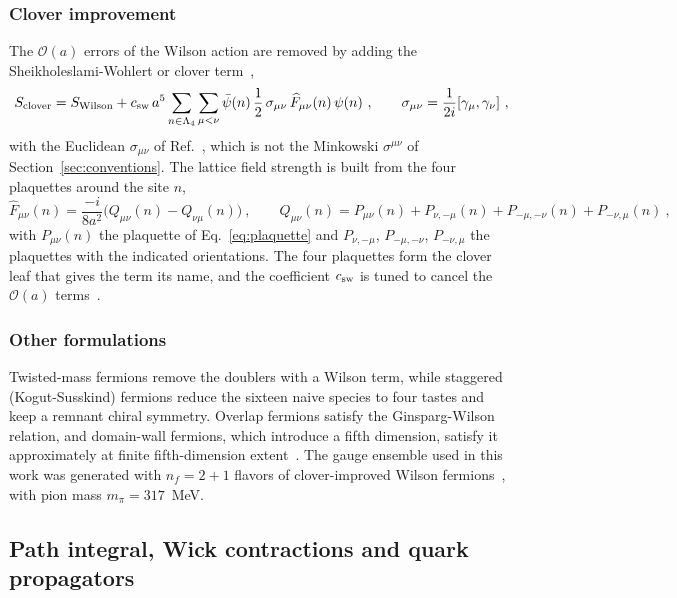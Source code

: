 \subsubsection{Clover improvement}
The $\mathcal O(a)$ errors of the Wilson action are removed by adding the Sheikholeslami-Wohlert or clover term~\cite{Sheikholeslami:1985ij,Gattringer:2010zz},
\begin{equation}
    S_{\rm clover}=S_{\rm Wilson}+c_{\rm sw}\,a^5\sum_{n\in\Lambda_4}\sum_{\mu<\nu}\bar\psi(n)\,\frac12\,\sigma_{\mu\nu}\,\widehat F_{\mu\nu}(n)\,\psi(n) \ , \qquad \sigma_{\mu\nu}=\frac{1}{2i}[\gamma_\mu,\gamma_\nu] \ ,
    \label{eq:clover_action}
\end{equation}
with the Euclidean $\sigma_{\mu\nu}$ of Ref.~\cite{Gattringer:2010zz}, which is not the Minkowski $\sigma^{\mu\nu}$ of Section~\ref{sec:conventions}. The lattice field strength is built from the four plaquettes around the site $n$,
\begin{equation}
    \widehat F_{\mu\nu}(n)=\frac{-i}{8a^2}\big(Q_{\mu\nu}(n)-Q_{\nu\mu}(n)\big) \ , \qquad
    Q_{\mu\nu}(n)=P_{\mu\nu}(n)+P_{\nu,-\mu}(n)+P_{-\mu,-\nu}(n)+P_{-\nu,\mu}(n) \ ,
    \label{eq:clover_F}
\end{equation}
with $P_{\mu\nu}(n)$ the plaquette of Eq.~\eqref{eq:plaquette} and $P_{\nu,-\mu}$, $P_{-\mu,-\nu}$, $P_{-\nu,\mu}$ the plaquettes with the indicated orientations. The four plaquettes form the clover leaf that gives the term its name, and the coefficient $c_{\rm sw}$ is tuned to cancel the $\mathcal O(a)$ terms~\cite{Lin:2014,Gattringer:2010zz}.

\subsubsection{Other formulations}
Twisted-mass fermions remove the doublers with a Wilson term, while staggered (Kogut-Susskind) fermions reduce the sixteen naive species to four tastes and keep a remnant chiral symmetry. Overlap fermions satisfy the Ginsparg-Wilson relation, and domain-wall fermions, which introduce a fifth dimension, satisfy it approximately at finite fifth-dimension extent~\cite{Gattringer:2010zz}. The gauge ensemble used in this work was generated with $n_f=2+1$ flavors of clover-improved Wilson fermions~\cite{Yoon:2017qzo}, with pion mass $m_\pi=317$~MeV.

\subsection{Path integral, Wick contractions and quark propagators}
\label{sec:lat_propagators}

